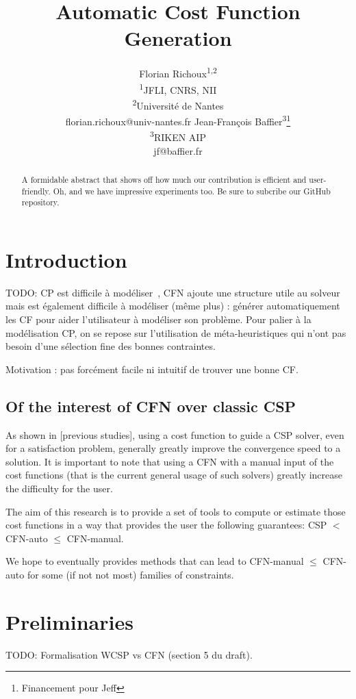 \documentclass[letterpaper]{article} %
\title{Automatic Cost Function Generation}
\author{Florian Richoux\textsuperscript{\rm 1,2}\\
  \textsuperscript{\rm 1}JFLI, CNRS, NII\\
  \textsuperscript{\rm 2}Université de Nantes\\
florian.richoux@univ-nantes.fr %
\And Jean-Fran\c{c}ois Baffier\textsuperscript{\rm 3}\thanks{Financement pour Jeff}\\
\textsuperscript{\rm 3}RIKEN AIP\\
jf@baffier.fr %
}
\newcommand{\cfn}{\textsc{CFN}\xspace}
\begin{document}
\maketitle

\begin{abstract}
A formidable abstract that shows off how much our contribution is efficient and user-friendly. Oh, and we have impressive experiments too. Be sure to subcribe our GitHub repository.
\end{abstract}

\section{Introduction}\label{sec:introduction}

TODO: CP est difficile à modéliser~\cite{Puget2004,Wallace2003}, CFN ajoute une structure utile au
solveur  mais est  également  difficile à  modéliser  (même plus)  :
générer  automatiquement   les  CF  pour  aider   l'utilisateur  à
modéliser  son problème.  Pour palier  à la  modélisation CP,  on se
repose sur  l'utilisation de méta-heuristiques qui  n'ont pas besoin
d'une sélection fine des bonnes contraintes. \cite{AMJFH2011,Bessiere2015,CBLS}

Motivation : pas forcément facile ni intuitif de trouver une bonne CF.

\subsection{Of the interest of \cfn over classic CSP}
As shown in [previous studies], using a cost function to guide a CSP solver, even for a satisfaction problem, generally greatly improve the convergence speed to a solution.
It is important to note that using a \cfn with a manual input of the cost functions (that is the current general usage of such solvers) greatly increase the difficulty for the user.

The aim of this research is to provide a set of tools to compute or estimate those cost functions in a way that provides the user the following guarantees:
CSP $<$ CFN-auto $\leq$ CFN-manual.

We hope to eventually provides methods that can lead to CFN-manual $\leq$ CFN-auto for some (if not not most) families of constraints.



\section{Preliminaries}\label{sec:preliminaries}
TODO: Formalisation    WCSP     vs    CFN     (section    5     du
draft). \cite{Bessiere2011,LK2014}
\end{document}

